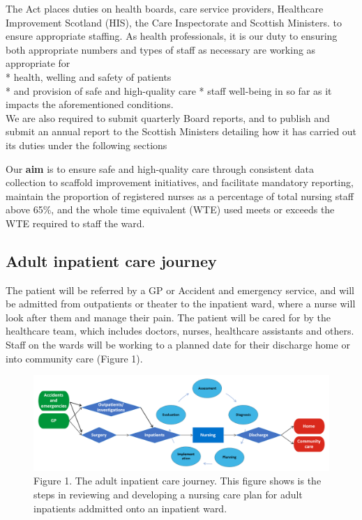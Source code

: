 \documentclass[
]{article}
\begin{document}
The Act places duties on health boards, care service providers,
Healthcare Improvement Scotland (HIS), the Care Inspectorate and
Scottish Ministers. to ensure appropriate staffing. As health
professionals, it is our duty to ensuring both appropriate numbers and
types of staff as necessary are working as appropriate for\\
* health, welling and safety of patients\\
* and provision of safe and high-quality care * staff well-being in so
far as it impacts the aforementioned conditions.\\
We are also required to submit quarterly Board reports, and to publish
and submit an annual report to the Scottish Ministers detailing how it
has carried out its duties under the following sections

Our \textbf{aim} is to ensure safe and high-quality care through
consistent data collection to scaffold improvement initiatives, and
facilitate mandatory reporting, maintain the proportion of registered
nurses as a percentage of total nursing staff above 65\%, and the whole
time equivalent (WTE) used meets or exceeds the WTE required to staff
the ward.

\hypertarget{adult-inpatient-care-journey}{%
\subsection{Adult inpatient care
journey}\label{adult-inpatient-care-journey}}

The patient will be referred by a GP or Accident and emergency service,
and will be admitted from outpatients or theater to the inpatient ward,
where a nurse will look after them and manage their pain. The patient
will be cared for by the healthcare team, which includes doctors,
nurses, healthcare assistants and others. Staff on the wards will be
working to a planned date for their discharge home or into community
care (Figure 1).

\begin{figure}
\centering
\includegraphics{./../../Output/Visuals/Adult inpatient care journey.png}
\caption{Figure 1. The adult inpatient care journey. This figure shows
is the steps in reviewing and developing a nursing care plan for adult
inpatients addmitted onto an inpatient ward.}
\end{figure}
\end{document}
